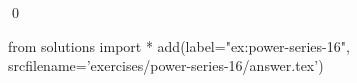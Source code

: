 
    \begin{ex}
  \label{ex:power-series-16}
  
  \qed
\end{ex}
\begin{python0}
from solutions import *
add(label="ex:power-series-16",
    srcfilename='exercises/power-series-16/answer.tex') 
\end{python0}                              
